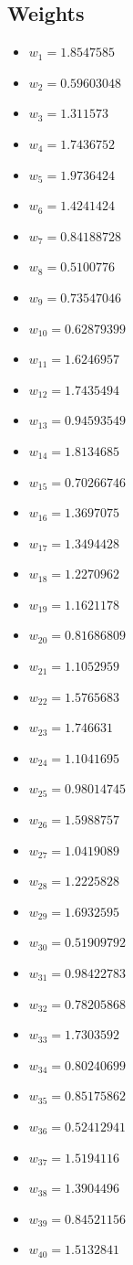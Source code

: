 \documentclass[11pt]{article}
\begin{document}
\subsection*{Weights}
\begin{itemize}
\item $w_{1} = 1.8547585$
\item $w_{2} = 0.59603048$
\item $w_{3} = 1.311573$
\item $w_{4} = 1.7436752$
\item $w_{5} = 1.9736424$
\item $w_{6} = 1.4241424$
\item $w_{7} = 0.84188728$
\item $w_{8} = 0.5100776$
\item $w_{9} = 0.73547046$
\item $w_{10} = 0.62879399$
\item $w_{11} = 1.6246957$
\item $w_{12} = 1.7435494$
\item $w_{13} = 0.94593549$
\item $w_{14} = 1.8134685$
\item $w_{15} = 0.70266746$
\item $w_{16} = 1.3697075$
\item $w_{17} = 1.3494428$
\item $w_{18} = 1.2270962$
\item $w_{19} = 1.1621178$
\item $w_{20} = 0.81686809$
\item $w_{21} = 1.1052959$
\item $w_{22} = 1.5765683$
\item $w_{23} = 1.746631$
\item $w_{24} = 1.1041695$
\item $w_{25} = 0.98014745$
\item $w_{26} = 1.5988757$
\item $w_{27} = 1.0419089$
\item $w_{28} = 1.2225828$
\item $w_{29} = 1.6932595$
\item $w_{30} = 0.51909792$
\item $w_{31} = 0.98422783$
\item $w_{32} = 0.78205868$
\item $w_{33} = 1.7303592$
\item $w_{34} = 0.80240699$
\item $w_{35} = 0.85175862$
\item $w_{36} = 0.52412941$
\item $w_{37} = 1.5194116$
\item $w_{38} = 1.3904496$
\item $w_{39} = 0.84521156$
\item $w_{40} = 1.5132841$
\end{itemize}
\end{document}
